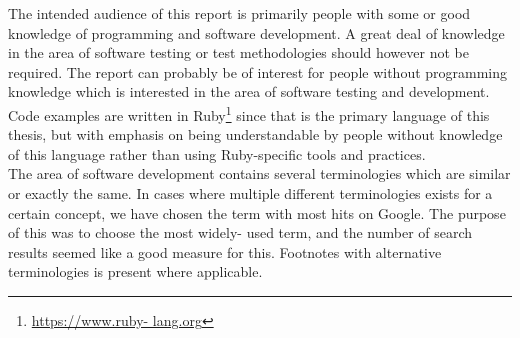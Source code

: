 
The intended audience of this report is primarily people with some or
good knowledge of programming and software development. A great deal of
knowledge in the area of software testing or test methodologies should
however not be required. The report can probably be of interest for
people without programming knowledge which is interested in the area of
software testing and development.\\

Code examples are written in Ruby\footnote{\url{https://www.ruby-
lang.org}} since that is the primary language of this thesis, but with
emphasis on being understandable by people without knowledge of this
language rather than using Ruby-specific tools and practices.\\

The area of software development contains several terminologies which
are similar or exactly the same. In cases where multiple different
terminologies exists for a certain concept, we have chosen the term with
most hits on Google. The purpose of this was to choose the most widely-
used term, and the number of search results seemed like a good measure
for this. Footnotes with alternative terminologies is present where
applicable.\\
